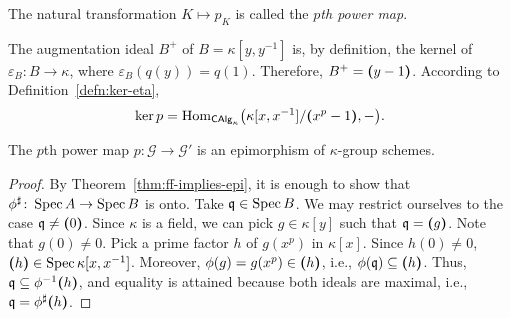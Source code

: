 The natural transformation $K\mapsto p_K$ is called the \textsl{$p$th power map}.

The augmentation ideal $B^+$ of $B=\kappa[y,y^{-1}]$ is, by definition, the kernel of $\varepsilon_B\colon B\to\kappa$, where $\varepsilon_B(q(y))=q(1)$. Therefore, $B^+=\textrm{\boldmath$($}y-1\textrm{\boldmath$)$}$. According to Definition~\ref{defn:ker-eta},
$$
    \ker p = {\rm Hom}_{\mathsf{CAlg}_\kappa}\big(\kappa[x,x^{-1}]/\textrm{\boldmath$($}x^p-1\textrm{\boldmath$)$},-\big).
$$

\begin{prop}
    The\/ $p$th power map\/ $p\colon\mathcal G\to\mathcal G'$ is an epimorphism of\/ $\kappa$-group schemes.
\end{prop}

\begin{proof}
    By Theorem~\ref{thm:ff-implies-epi}, it is enough to show that $\phi^\sharp\colon\operatorname{Spec} A\to\operatorname{Spec} B$ is onto. Take $\mathfrak q\in\operatorname{Spec} B$. We may restrict ourselves to the case $\mathfrak q\ne\textrm{\boldmath$($}0\textrm{\boldmath$)$}$. Since $\kappa$ is a field, we can pick $g\in\kappa[y]$ such that $\mathfrak q=\textrm{\boldmath$($}g\textrm{\boldmath$)$}$. Note that $g(0)\ne0$. Pick a prime factor $h$ of $g(x^p)$ in $\kappa[x]$. Since $h(0)\ne0$, $\textrm{\boldmath$($}h\textrm{\boldmath$)$}\in\operatorname{Spec}\kappa[x,x^{-1}]$. Moreover, $\phi(g)=g(x^p)\in\textrm{\boldmath$($}h\textrm{\boldmath$)$}$, i.e., $\phi(\mathfrak q)\subseteq\textrm{\boldmath$($}h\textrm{\boldmath$)$}$. Thus, $\mathfrak q\subseteq\phi^{-1}\textrm{\boldmath$($}h\textrm{\boldmath$)$}$, and equality is attained because both ideals are maximal, i.e., $\mathfrak q=\phi^\sharp\textrm{\boldmath$($}h\textrm{\boldmath$)$}$.
\end{proof}

